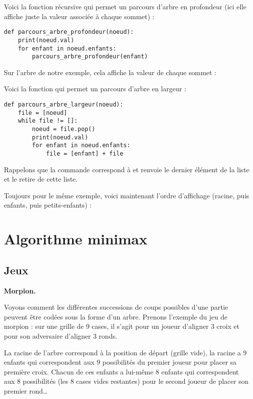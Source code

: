 \documentclass[11pt,class=report,crop=false]{standalone}
\begin{document}
Voici la fonction récursive qui permet un parcours d'arbre en profondeur (ici elle affiche juste la valeur associée à chaque sommet) :
\begin{lstlisting}	
def parcours_arbre_profondeur(noeud):
	print(noeud.val)
	for enfant in noeud.enfants:
	    parcours_arbre_profondeur(enfant)
\end{lstlisting}

Sur l'arbre de notre exemple, cela affiche la valeur de chaque sommet :

Voici la fonction qui permet un parcours d'arbre en largeur :	
\begin{lstlisting}
def parcours_arbre_largeur(noeud):
    file = [noeud]
    while file != []:
        noeud = file.pop()
        print(noeud.val)
        for enfant in noeud.enfants:
            file = [enfant] + file	
\end{lstlisting}

Rappelons que la commande  correspond à  et renvoie le dernier élément de la liste et le retire de cette liste.

Toujours pour le même exemple, voici maintenant l'ordre d'affichage (racine, puis enfants, puis petits-enfants) :
		
\section{Algorithme minimax}


\subsection{Jeux}


\textbf{Morpion.}

Voyons comment les différentes successions de coups possibles d'une partie peuvent être codées sous la forme d'un arbre. Prenons l'exemple du jeu de morpion : sur une grille de 9 cases, il s'agit pour un joueur d'aligner 3 croix et pour son adversaire d'aligner 3 ronds.

\begin{center}
\end{center}


La racine de l'arbre correspond à la position de départ (grille vide), la racine a $9$ enfants qui correspondent aux $9$ possibilités du premier joueur pour placer sa première croix. Chacun de ces enfants a lui-même 8 enfants qui correspondent aux 8 possibilités (les 8 cases vides restantes) pour le second joueur de placer son premier rond\ldots
\end{document}
